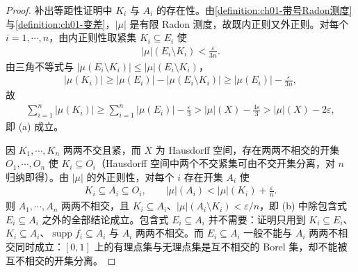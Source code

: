\documentclass[../../main.tex]{subfiles}%
\begin{document}
\begin{proof}
补出等距性证明中 $K_i$ 与 $A_i$ 的存在性。由\cref{definition:ch01-带号Radon测度}与\cref{definition:ch01-变差}，$|\mu|$ 是有限 Radon 测度，故既内正则又外正则。对每个 $i=1,\cdots ,n$，由内正则性取紧集 $K_i\subseteq E_i$ 使
\begin{align*}
|\mu|(E_i\setminus K_i)<\frac{\varepsilon}{3n}.
\end{align*}
由三角不等式与 $|\mu(E_i\setminus K_i)|\leqslant|\mu|(E_i\setminus K_i)$，
\begin{align*}
|\mu(K_i)|\geqslant|\mu(E_i)|-|\mu(E_i\setminus K_i)|\geqslant|\mu(E_i)|-\frac{\varepsilon}{3n},
\end{align*}
故
\begin{align*}
\sum_{i=1}^n|\mu(K_i)|\geqslant\sum_{i=1}^n|\mu(E_i)|-\frac{\varepsilon}{3}>|\mu|(X)-\frac{4\varepsilon}{3}>|\mu|(X)-2\varepsilon,
\end{align*}
即 (a) 成立。

因 $K_1,\cdots ,K_n$ 两两不交且紧，而 $X$ 为 Hausdorff 空间，存在两两不相交的开集 $O_1,\cdots ,O_n$ 使 $K_i\subseteq O_i$（Hausdorff 空间中两个不交紧集可由不交开集分离，对 $n$ 归纳即得）。由 $|\mu|$ 的外正则性，对每个 $i$ 存在开集 $A_i$ 使
\begin{align*}
K_i\subseteq A_i\subseteq O_i,\qquad|\mu|(A_i)<|\mu|(K_i)+\frac{\varepsilon}{n}.
\end{align*}
则 $A_1,\cdots ,A_n$ 两两不相交，且 $K_i\subseteq A_i$、$|\mu|(A_i\setminus K_i)<\varepsilon/n$，即 (b) 中除包含式 $E_i\subseteq A_i$ 之外的全部结论成立。包含式 $E_i\subseteq A_i$ 并不需要：证明只用到 $K_i\subseteq E_i$、$K_i\subseteq A_i$、$\operatorname{supp}f_i\subseteq A_i$ 与 $A_i$ 两两不相交。而 $E_i\subseteq A_i$ 一般不能与 $A_i$ 两两不相交同时成立：$[0,1]$ 上的有理点集与无理点集是互不相交的 Borel 集，却不能被互不相交的开集分离。
\end{proof}
\end{document}

